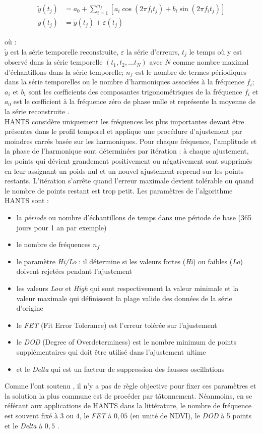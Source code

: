 \begin{align}   
    \tilde{y}(t_{j}) &= a_{0} + \sum_{i=1}^{n_{f}} [a_{i}\cos(2\pi f_{i} t_{j}) + b_{i}\sin(2\pi f_{i} t_{j})] \\
    y(t_{j}) &= \tilde{y}(t_{j}) + \varepsilon(t_{j})
\end{align}

où : \\
$\tilde{y}$ est la série temporelle reconstruite, $\varepsilon$ la série d'erreurs, $t_{j}$ le temps où y est observé
dans la série temporelle $(t_{1}, t_{2}, \ldots{} t_{N} )$ avec $N$ comme nombre maximal d’échantillons dans
la série temporelle; $n_{f}$ est le nombre de termes périodiques dans la série temporelles ou
le nombre d’harmoniques associées à la fréquence $f_{i}$; $a_{i}$ et $b_{i}$ sont les c\oe fficients des
composantes trigonométriques de la fréquence $f_{i}$ et $a_{0}$ est le c\oe fficient à la fréquence zéro de phase nulle et représente la moyenne de la série reconstruite \citep{Zhou2015}.
\\HANTS considère uniquement les fréquences les plus importantes devant être présentes dans le profil temporel et applique une procédure d'ajustement par moindres carrés basée sur les harmoniques. Pour chaque fréquence, l'amplitude et la phase de l'harmonique sont déterminées par itération : à chaque ajustement, les points qui dévient grandement positivement ou négativement sont supprimés en leur assignant un poids nul et un nouvel ajustement reprend sur les points restants. L'itération s'arrête quand l'erreur maximale devient tolérable ou quand le nombre de points restant est trop petit. Les paramètres de l'algorithme HANTS sont :
\begin{itemize}
 \item la \emph{période} ou nombre d'échantillons de temps dans une période de base (365 jours pour 1 an par exemple)
 \item le nombre de fréquences $n_{f}$
 \item le paramètre \emph{Hi/Lo} : il détermine si les valeurs fortes (\emph{Hi}) ou faibles (\emph{Lo}) doivent rejetées pendant l'ajustement
 \item les valeurs \emph{Low} et \emph{High} qui sont respectivement la valeur minimale et la valeur maximale
 qui définissent la plage valide des données de la série d'origine
 \item le \emph{FET} (Fit Error Tolerance) est l'erreur tolérée sur l'ajustement
 \item le \emph{DOD} (Degree of Overdeterminess) est le nombre minimum de points supplémentaires qui doit être utilisé dans l'ajustement ultime
 \item et le \emph{Delta} qui est un facteur de suppression des fausses oscillations \citep{Roerink2000}\end{itemize}
Comme l'ont soutenu \citet{Roerink2000}, il n'y a pas de règle objective pour fixer ces paramètres et la solution la plus commune est de procéder par tâtonnement. Néanmoins, en se référant aux applications de HANTS dans la littérature, le nombre de fréquence est souvent fixé à $3$ ou $4$, le \emph{FET} à $0,05$ (en unité de NDVI), le  \emph{DOD} à 5 points et le \emph{Delta} à $0,5$ \citep{Roerink2000,Zhou2015}.

